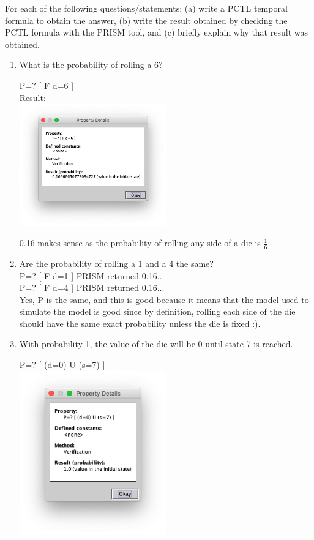 \documentclass{article}
\begin{document}
\begin{enumerate}
For each of the following questions/statements: (a) write a PCTL temporal formula to obtain the answer, (b) write the result obtained by checking the PCTL formula with the PRISM tool, and (c) briefly explain why that result was obtained.
\begin{enumerate}
\item What is the probability of rolling a 6? \\
  \begin{center}
    P=? [ F d=6 ] \\
    Result: \\
    \includegraphics[width=0.5\textwidth]{p6}\\
  \end{center}
  0.16 makes sense as the probability of rolling any side of a die is $\frac{1}{6}$ 
\item Are the probability of rolling a 1 and a 4 the same? \\
  P=? [ F d=1 ] PRISM returned 0.16...\\
  P=? [ F d=4 ] PRISM returned 0.16...\\
  Yes, P is the same, and this is good because it means that the model used to simulate the model is good since by definition, rolling each side of the die should have the same exact probability unless the die is fixed :).\\
\item With probability 1, the value of the die will be 0 until state 7 is reached.
  \begin{center}
    P=? [ (d=0) U (s=7) ] \\
    \includegraphics[width=0.5\textwidth]{s3d4}

\end{center}
\end{enumerate}
\end{enumerate}
\end{document}

